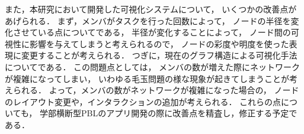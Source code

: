 \documentclass[twoside]{wiss}
\begin{document}
また，本研究において開発した可視化システムについて，
いくつかの改善点があげられる．
まず，メンバがタスクを行った回数によって，
ノードの半径を変化させている点についてである，
半径が変化することによって，
ノード間の可視性に影響を与えてしまうと考えられるので，
ノードの彩度や明度を使った表現に変更することが考えられる．
つぎに，現在のグラフ構造による可視化手法についてである．
この問題点としては，
メンバの数が増えた際にネットワークが複雑になってしまい，
いわゆる毛玉問題の様な現象が起きてしまうことが考えられる．
よって，メンバの数がネットワークが複雑になった場合の，
ノードのレイアウト変更や，インタラクションの追加が考えられる．
これらの点についても，
学部横断型PBLのアプリ開発の際に改善点を精査し，修正する予定である．





\balance %



\end{document}
